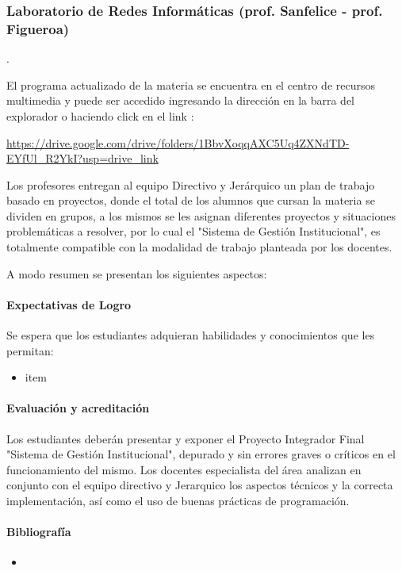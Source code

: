 \subsubsection{Laboratorio de Redes Informáticas (prof. Sanfelice - prof. Figueroa)}.

El programa actualizado de la materia se encuentra en el centro de recursos multimedia y puede ser accedido ingresando la dirección en la barra del explorador o haciendo click en el link :


\url{https://drive.google.com/drive/folders/1BbvXoqqAXC5Uq4ZXNdTD-EYfUl_R2YkI?usp=drive_link}



Los profesores entregan al equipo Directivo y Jerárquico un plan de trabajo basado en proyectos, donde el total de los alumnos que cursan la materia se dividen en grupos, a los mismos se les asignan diferentes proyectos y situaciones problemáticas a resolver, por lo cual el "Sistema de Gestión Institucional", es totalmente compatible con la modalidad de trabajo planteada por los docentes.

A modo resumen se presentan los siguientes aspectos:
\paragraph{Expectativas de Logro}
Se espera que los estudiantes adquieran habilidades y conocimientos que les permitan: 

\begin{itemize}
    \item item
\end{itemize}

\paragraph{Evaluación y acreditación}

Los estudiantes deberán presentar y exponer el Proyecto Integrador Final "Sistema de Gestión Institucional", depurado y sin errores graves o críticos en el funcionamiento del mismo. Los docentes especialista del área analizan en conjunto con el equipo directivo y Jerarquico los aspectos técnicos y la correcta implementación, así como el uso de buenas prácticas de programación.

\paragraph{Bibliografía}
\begin{itemize}
    \item  

\end{itemize}